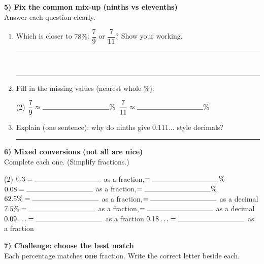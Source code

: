 \documentclass[12pt]{article}
\newcommand{\blank}{\rule{3.3cm}{0.4pt}}
\newcommand{\blanklong}{\rule{7.2cm}{0.4pt}}
\begin{document}
\vspace{6pt}
{\Large \textbf{5) Fix the common mix-up (ninths vs elevenths)}}\\
Answer each question clearly.

\begin{enumerate}[label=\textbf{(\alph*)},itemsep=4pt]
\item Which is closer to \(78\%\): \(\dfrac{7}{9}\) or \(\dfrac{7}{11}\)? Show your working.\\
\blanklong\\ \blanklong

\item Fill in the missing values (nearest whole \%):\\[-4pt]
\begin{tasks}(2)
\task \( \dfrac{7}{9} \approx \blank\% \)
\task \( \dfrac{7}{11} \approx \blank\% \)
\end{tasks}

\item Explain (one sentence): why do ninths give \(0.111\ldots\) style decimals?\\
\blanklong
\end{enumerate}

\vspace{6pt}
{\Large \textbf{6) Mixed conversions (not all are nice)}}\\
Complete each one. (Simplify fractions.)

\begin{tasks}(2)
\task \( 0.3 = \blank \) as a fraction,\quad \(=\blank\%\)
\task \( 0.08 = \blank \) as a fraction,\quad \(=\blank\%\)
\task \( 62.5\% = \blank \) as a fraction,\quad \(=\blank \) as a decimal
\task \( 7.5\% = \blank \) as a fraction,\quad \(=\blank \) as a decimal
\task \( 0.09\ldots = \blank \) as a fraction
\task \( 0.18\ldots = \blank \) as a fraction
\end{tasks}

\vspace{6pt}
{\Large \textbf{7) Challenge: choose the best match}}\\
Each percentage matches \textbf{one} fraction. Write the correct letter beside each.\\[-6pt]
\end{document}
